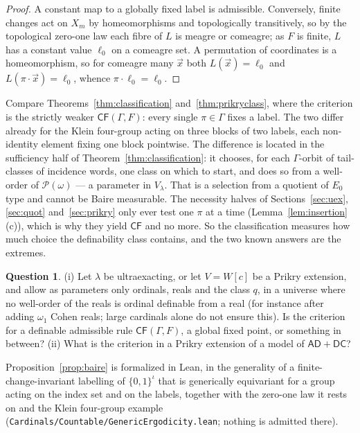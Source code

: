 \documentclass[11pt,letterpaper]{article}
\theoremstyle{definition}
\newtheorem{question}[definition]{Question}
\numberwithin{equation}{section}
\newcommand{\Pow}{\mathcal P}
\newcommand{\CF}{\mathsf{CF}}
\begin{document}
\begin{proof}
A constant map to a globally fixed label is admissible. Conversely, finite changes act on $X_m$ by homeomorphisms and topologically transitively, so by the topological zero-one law \cite[Section~8]{kechris} each fibre of $L$ is meagre or comeagre; as $F$ is finite, $L$ has a constant value $\ell_0$ on a comeagre set. A permutation of coordinates is a homeomorphism, so for comeagre many $\vec x$ both $L(\vec x)=\ell_0$ and $L(\pi\cdot\vec x)=\ell_0$, whence $\pi\cdot\ell_0=\ell_0$.
\end{proof}

Compare Theorems~\ref{thm:classification} and~\ref{thm:prikryclass}, where the criterion is the strictly weaker $\CF(\Gamma,F)$: every single $\pi\in\Gamma$ fixes a label. The two differ already for the Klein four-group acting on three blocks of two labels, each non-identity element fixing one block pointwise. The difference is located in the sufficiency half of Theorem~\ref{thm:classification}: it chooses, for each $\Gamma$-orbit of tail-classes of incidence words, one class on which to start, and does so from a well-order of $\Pow(\omega)$ --- a parameter in $V_\lambda$. That is a selection from a quotient of $E_0$ type and cannot be Baire measurable. The necessity halves of Sections~\ref{sec:uex}, \ref{sec:quot} and~\ref{sec:prikry} only ever test one $\pi$ at a time (Lemma~\ref{lem:insertion}(c)), which is why they yield $\CF$ and no more. So the classification measures how much choice the definability class contains, and the two known answers are the extremes.

\begin{question}
(i) Let $\lambda$ be ultraexacting, or let $V=W[c]$ be a Prikry extension, and allow as parameters only ordinals, reals and the class $q$, in a universe where no well-order of the reals is ordinal definable from a real (for instance after adding $\omega_1$ Cohen reals; large cardinals alone do not ensure this). Is the criterion for a definable admissible rule $\CF(\Gamma,F)$, a global fixed point, or something in between? (ii) What is the criterion in a Prikry extension of a model of $\mathsf{AD}+\mathsf{DC}$?
\end{question}

Proposition~\ref{prop:baire} is formalized in Lean, in the generality of a finite-change-invariant labelling of $\{0,1\}^\iota$ that is generically equivariant for a group acting on the index set and on the labels, together with the zero-one law it rests on and the Klein four-group example (\nolinkurl{Cardinals/Countable/GenericErgodicity.lean}; nothing is admitted there).
\end{document}
